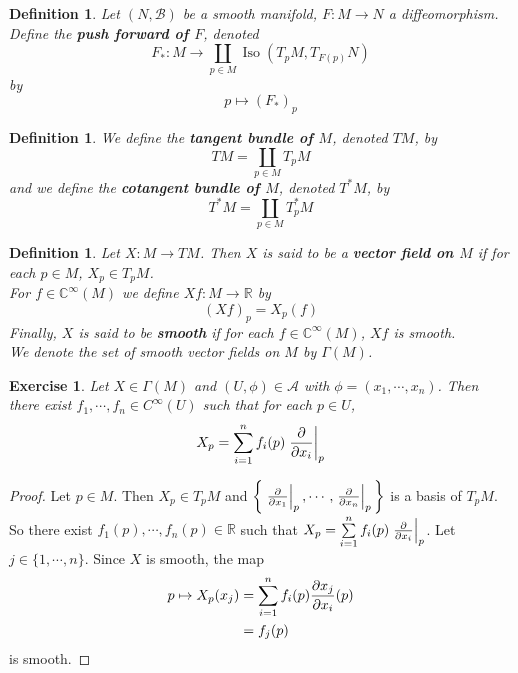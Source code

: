 \documentclass[12pt]{amsart}
\newtheorem{defn}[thm]{Definition}
\newtheorem{ex}[thm]{Exercise}
\newcommand{\Gam}{\Gamma}
\newcommand{\C}{\mathbb{C}}
\newcommand{\R}{\mathbb{R}}
\newcommand{\MA}{\mathcal{A}}
\newcommand{\MB}{\mathcal{B}}
\DeclareMathOperator{\iso}{Iso}
\begin{document}
	\begin{defn}
		Let $(N, \MB)$ be a smooth manifold, $F: M \rightarrow N$ a diffeomorphism. Define the \textbf{push forward of $F$}, denoted $$F_*:M \rightarrow \coprod_{p \in M} \iso(T_pM, T_{F(p)}N)$$ by $$p \mapsto (F_*)_p$$
	\end{defn}
	
		\begin{defn}
		We define the \textbf{tangent bundle of $M$}, denoted $TM$, by $$TM = \coprod_{p \in M} T_pM$$ 
		and we define the \textbf{cotangent bundle of $M$}, denoted $T^*M$, by 
		$$T^*M = \coprod_{p \in M} T_p^*M$$
	\end{defn}
	
	\begin{defn}
		Let $X: M \rightarrow TM$. Then $X$ is said to be a \textbf{vector field on $M$} if for each $p \in M$, $X_p \in T_p M$. \\
		For $f \in \C^{\infty}(M)$ we define $Xf : M \rightarrow \R$ by $$(Xf)_p = X_p(f)$$ 
		Finally, $X$ is said to be \textbf{smooth} if for each $f \in \C^{\infty}(M)$, $Xf$ is smooth.\\
		We denote the set of smooth vector fields on $M$ by $\Gam(M)$.
	\end{defn}

	\begin{ex}
		Let $X \in \Gam(M)$ and $(U, \phi) \in \MA$ with $\phi = (x_1, \cdots, x_n)$. Then there exist $f_1, \cdots, f_n \in C^{\infty}(U)$ such that for each $p \in U$, $$X_p = \sum_{i=1}^n f_i(p) \eval{\pdv{x_i}}_{p}$$ 
	\end{ex}

	\begin{proof}
		Let $p \in M$. Then $X_p \in T_pM$ and $\bigg \{ \eval{\pdv{x_{1}}}_{p}, \cdots, \eval{\pdv{x_{n}}}_{p} \bigg \}$ is a basis of $T_pM$. So there exist $f_1(p), \cdots, f_n(p) \in \R$ such that $X_p = \sum\limits_{i=1}^n f_i(p) \eval{\pdv{x_i}}_{p}$. Let $j \in \{1, \cdots, n\}$. Since $X$ is smooth, the map 
		\begin{align*}
			p \mapsto X_p(x_j)
			&= \sum\limits_{i=1}^n f_i(p) {\pdv{x_j}{x_i}}(p) \\
			&= f_j(p) \\
		\end{align*} is smooth.
	\end{proof}

	

	
	
\end{document}
